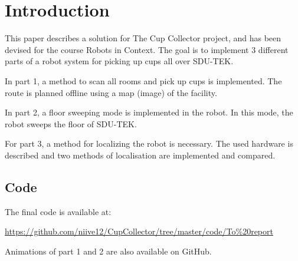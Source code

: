 \section{Introduction}
\label{sec:introduction}
This paper describes a solution for The Cup Collector project,
and has been devised for the course Robots in Context.
The goal is to implement 3 different parts of a robot system for picking up cups all over SDU-TEK. 

In part 1, a method to scan all rooms and pick up cups is implemented.
The route is planned offline using a map (image) of the facility. 

In part 2, a floor sweeping mode is implemented in the robot.
In this mode, the robot sweeps the floor of SDU-TEK.  

For part 3, a method for localizing the robot is necessary.
The used hardware is described and two methods of localisation are implemented and compared.

\subsection{Code}
The final code is available at: 

\url{https://github.com/niive12/CupCollector/tree/master/code/To\%20report}

Animations of part 1 and 2 are also available on GitHub. 